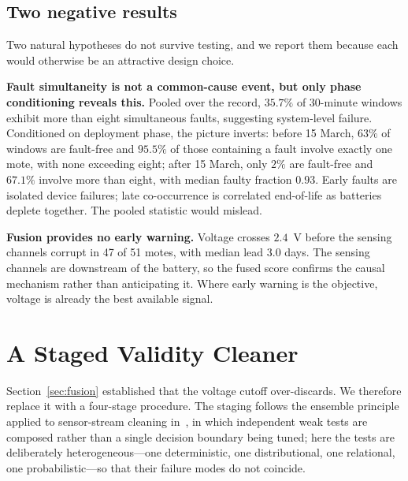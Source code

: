 \documentclass[conference]{IEEEtran}
\begin{document}
\subsection{Two negative results}

Two natural hypotheses do not survive testing, and we report them because each
would otherwise be an attractive design choice.

\textbf{Fault simultaneity is not a common-cause event, but only phase
conditioning reveals this.} Pooled over the record, $35.7\%$ of $30$-minute
windows exhibit more than eight simultaneous faults, suggesting system-level
failure. Conditioned on deployment phase, the picture inverts: before 15 March,
$63\%$ of windows are fault-free and $95.5\%$ of those containing a fault
involve exactly one mote, with none exceeding eight; after 15 March, only $2\%$
are fault-free and $67.1\%$ involve more than eight, with median faulty
fraction $0.93$. Early faults are isolated device failures; late co-occurrence
is correlated end-of-life as batteries deplete together. The pooled statistic
would mislead.

\textbf{Fusion provides no early warning.} Voltage crosses $2.4$~V before the
sensing channels corrupt in 47 of 51 motes, with median lead $3.0$ days. The
sensing channels are downstream of the battery, so the fused score confirms the
causal mechanism rather than anticipating it. Where early warning is the
objective, voltage is already the best available signal.

\section{A Staged Validity Cleaner}
\label{sec:cleaner}

Section~\ref{sec:fusion} established that the voltage cutoff over-discards.
We therefore replace it with a four-stage procedure. The staging follows the
ensemble principle applied to sensor-stream cleaning in~\cite{iyer2015}, in
which independent weak tests are composed rather than a single decision
boundary being tuned; here the tests are deliberately heterogeneous---one
deterministic, one distributional, one relational, one probabilistic---so that
their failure modes do not coincide.
\end{document}
